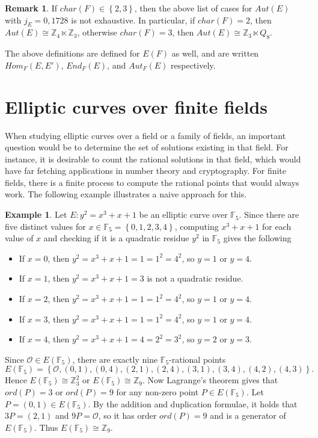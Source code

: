 \documentclass{article}
\newcommand{\F}{\mathbb{F}}
\newcommand{\Z}{\mathbb{Z}}
\newcommand{\rb}[1]{\left( #1 \right)}
\newcommand{\cb}[1]{\left\{ #1 \right\}}
\theoremstyle{definition}\newtheorem*{definition}{Definition}
\theoremstyle{definition}\newtheorem*{example}{Example}
\theoremstyle{definition}\newtheorem*{remark}{Remark}
\begin{document}
\begin{remark}
If $ char\rb{F} \in \cb{2, 3} $, then the above list of cases for $ Aut\rb{E} $ with $ j_E = 0, 1728 $ is not exhaustive. In particular, if $ char\rb{F} = 2 $, then $ Aut\rb{E} \cong \Z_4 \ltimes \Z_3 $, otherwise $ char\rb{F} = 3 $, then $ Aut\rb{E} \cong \Z_3 \ltimes Q_8 $.
\end{remark}

The above definitions are defined for $ E\rb{F} $ as well, and are written $ Hom_F\rb{E, E'} $, $ End_F\rb{E} $, and $ Aut_F\rb{E} $ respectively.

\pagebreak

\section{Elliptic curves over finite fields}

When studying elliptic curves over a field or a family of fields, an important question would be to determine the set of solutions existing in that field. For instance, it is desirable to count the rational solutions in that field, which would have far fetching applications in number theory and cryptography. For finite fields, there is a finite process to compute the rational points that would always work. The following example illustrates a naive approach for this.

\begin{example}
Let $ E : y^2 = x^3 + x + 1 $ be an elliptic curve over $ \F_5 $. Since there are five distinct values for $ x \in \F_5 = \cb{0, 1, 2, 3, 4} $, computing $ x^3 + x + 1 $ for each value of $ x $ and checking if it is a quadratic residue $ y^2 $ in $ \F_5 $ gives the following
\begin{itemize}
\item If $ x = 0 $, then $ y^2 = x^3 + x + 1 = 1 = 1^2 = 4^2 $, so $ y = 1 $ or $ y = 4 $.
\item If $ x = 1 $, then $ y^2 = x^3 + x + 1 = 3 $ is not a quadratic residue.
\item If $ x = 2 $, then $ y^2 = x^3 + x + 1 = 1 = 1^2 = 4^2 $, so $ y = 1 $ or $ y = 4 $.
\item If $ x = 3 $, then $ y^2 = x^3 + x + 1 = 1 = 1^2 = 4^2 $, so $ y = 1 $ or $ y = 4 $.
\item If $ x = 4 $, then $ y^2 = x^3 + x + 1 = 4 = 2^2 = 3^2 $, so $ y = 2 $ or $ y = 3 $.
\end{itemize}
Since $ \mathcal{O} \in E\rb{\F_5} $, there are exactly nine $ \F_5 $-rational points
$$ E\rb{\F_5} = \cb{\mathcal{O}, \rb{0, 1}, \rb{0, 4}, \rb{2, 1}, \rb{2, 4}, \rb{3, 1}, \rb{3, 4}, \rb{4, 2}, \rb{4, 3}}. $$
Hence $ E\rb{\F_5} \cong \Z_3^2 $ or $ E\rb{\F_5} \cong \Z_9 $. Now Lagrange's theorem gives that $ ord\rb{P} = 3 $ or $ ord\rb{P} = 9 $ for any non-zero point $ P \in E\rb{\F_5} $. Let $ P = \rb{0, 1} \in E\rb{\F_5} $. By the addition and duplication formulae, it holds that $ 3P = \rb{2, 1} $ and $ 9P = \mathcal{O} $, so it has order $ ord\rb{P} = 9 $ and is a generator of $ E\rb{\F_5} $. Thus $ E\rb{\F_5} \cong \Z_9 $.
\end{example}
\end{document}
